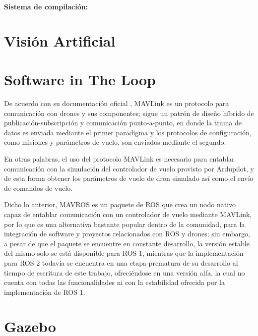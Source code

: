 \textbf{Sistema de compilación:} 


\section{Visión Artificial}


\section{Software in The Loop}

De acuerdo con su documentación oficial \cite{MAVLink}, MAVLink es un protocolo para comunicación con drones y sus componentes; sigue un patrón de diseño híbrido de publicación-subscripción y comunicación punto-a-punto, en donde la trama de datos es enviada mediante el primer paradigma y los protocolos de configuración, como misiones y parámetros de vuelo, son enviados mediante el segundo.

En otras palabras, el uso del protocolo MAVLink es necesario para entablar comunicación con la simulación del controlador de vuelo provisto por Ardupilot, y de esta forma obtener los parámetros de vuelo de dron simulado así como el envío de comandos de vuelo.

Dicho lo anterior, MAVROS \cite{MAVROS} es un paquete de ROS que crea un nodo nativo capaz de entablar comunicación con un controlador de vuelo mediante MAVLink, por lo que es una alternativa bastante popular dentro de la comunidad, para la integración de software y proyectos relacionados con ROS y drones; sin embargo, a pesar de que el paquete se encuentre en constante desarrollo, la versión estable del mismo solo se está disponible para ROS 1, mientras que la implementación para ROS 2 todavía se encuentra en una etapa prematura de su desarrollo al tiempo de escritura de este trabajo, ofreciéndose en una versión alfa, la cual no cuenta con todas las funcionalidades ni con la estabilidad ofrecida por la implementación de ROS 1.


\section{Gazebo}

